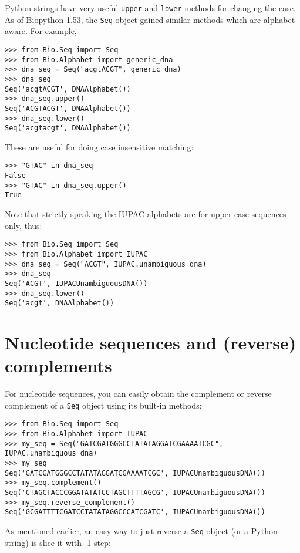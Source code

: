 \documentclass{report}
\begin{document}
Python strings have very useful \verb|upper| and \verb|lower| methods for changing the case.
As of Biopython 1.53, the \verb|Seq| object gained similar methods which are alphabet aware.
For example,

\begin{verbatim}
>>> from Bio.Seq import Seq
>>> from Bio.Alphabet import generic_dna
>>> dna_seq = Seq("acgtACGT", generic_dna)
>>> dna_seq
Seq('acgtACGT', DNAAlphabet())
>>> dna_seq.upper()
Seq('ACGTACGT', DNAAlphabet())
>>> dna_seq.lower()
Seq('acgtacgt', DNAAlphabet())
\end{verbatim}

These are useful for doing case insensitive matching:

\begin{verbatim}
>>> "GTAC" in dna_seq
False
>>> "GTAC" in dna_seq.upper()
True
\end{verbatim}

Note that strictly speaking the IUPAC alphabets are for upper case
sequences only, thus:

\begin{verbatim}
>>> from Bio.Seq import Seq
>>> from Bio.Alphabet import IUPAC
>>> dna_seq = Seq("ACGT", IUPAC.unambiguous_dna)
>>> dna_seq
Seq('ACGT', IUPACUnambiguousDNA())
>>> dna_seq.lower()
Seq('acgt', DNAAlphabet())
\end{verbatim}


\section{Nucleotide sequences and (reverse) complements}
\label{sec:seq-reverse-complement}

For nucleotide sequences, you can easily obtain the complement or reverse
complement of a \verb|Seq| object using its built-in methods:

\begin{verbatim}
>>> from Bio.Seq import Seq
>>> from Bio.Alphabet import IUPAC
>>> my_seq = Seq("GATCGATGGGCCTATATAGGATCGAAAATCGC", IUPAC.unambiguous_dna)
>>> my_seq
Seq('GATCGATGGGCCTATATAGGATCGAAAATCGC', IUPACUnambiguousDNA())
>>> my_seq.complement()
Seq('CTAGCTACCCGGATATATCCTAGCTTTTAGCG', IUPACUnambiguousDNA())
>>> my_seq.reverse_complement()
Seq('GCGATTTTCGATCCTATATAGGCCCATCGATC', IUPACUnambiguousDNA())
\end{verbatim}

As mentioned earlier, an easy way to just reverse a \verb|Seq| object (or a
Python string) is slice it with -1 step:
\end{document}
